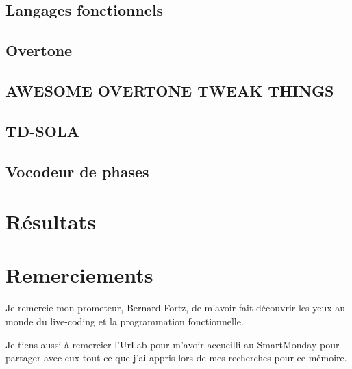 \documentclass[letterpaper]{article}
\begin{document}
\subsection{Langages fonctionnels}

\subsection{Overtone}

\subsection{AWESOME OVERTONE TWEAK THINGS}
\subsection{TD-SOLA}
\subsection{Vocodeur de phases}


\section{Résultats}

\section{Remerciements}
  Je remercie mon prometeur, Bernard Fortz, de m'avoir fait découvrir
  les yeux au monde du live-coding et la programmation fonctionnelle.

  Je tiens aussi à remercier l'UrLab pour m'avoir accueilli au SmartMonday
  pour partager avec eux tout ce que j'ai appris lors de mes recherches
  pour ce mémoire.
\footnotesize


\end{document}
